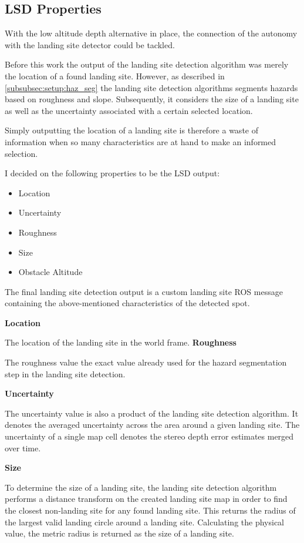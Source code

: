\subsection{LSD Properties}\label{sec:LSproperties}

With the low altitude depth alternative in place, the connection of the autonomy with the landing site detector could be tackled. 

Before this work the output of the landing site detection algorithm was merely the location of a found landing site. However, as described in \cref{subsubsec:setup:haz_seg} the landing site detection algorithms segments hazards based on roughness and slope. Subsequently, it considers the size of a landing site as well as the uncertainty associated with a certain selected location. 

Simply outputting the location of a landing site is therefore a waste of information when so many characteristics are at hand to make an informed selection. 

I decided on the following properties to be the LSD output:

\begin{itemize}
    \item Location
    \item Uncertainty
    \item Roughness
    \item Size
    \item Obstacle Altitude
\end{itemize}
The final landing site detection output is a custom landing site ROS message containing the above-mentioned characteristics of the detected spot.

\textbf{Location}

The location of the landing site in the world frame.
\textbf{Roughness}

The roughness value the exact value already used for the hazard segmentation step in the landing site detection. 

\textbf{Uncertainty}

The uncertainty value is also a product of the landing site detection algorithm. It denotes the averaged uncertainty across the area around a given landing site. The uncertainty of a single map cell denotes the stereo depth error estimates merged over time.

\textbf{Size}

To determine the size of a landing site, the landing site detection algorithm performs a distance transform on the created landing site map in order to find the closest non-landing site for any found landing site. This returns the radius of the largest valid landing circle around a landing site. Calculating the physical value, the metric radius is returned as the size of a landing site.

